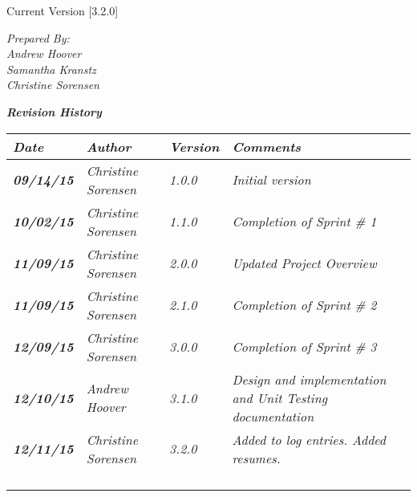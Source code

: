 


Current Version [3.2.0]
\vspace*{5mm}

{\color{MSBlue3}
\noindent
\textit{Prepared By:}\\
\textit{Andrew Hoover}\\
\textit{Samantha Kranstz}\\
\textit{Christine Sorensen}
}

\vfill
\noindent
{\color{color02} \textit{\textbf{Revision History}}}\\
\begin{tabular}{|>{\raggedright}p{1.5cm}|>{\raggedright}p{3cm}|>{\raggedright}p{1.5cm}|>{\raggedright}p{9cm}|}
\hline
\textit{\textbf{Date}} &  \textit{\textbf{Author}} & \textit{\textbf{Version}} & \textit{\textbf{Comments}}\tabularnewline
\hline
\textit{\textbf{09/14/15}} & \textit{Christine Sorensen} & \textit{1.0.0} & \textit{Initial version}\tabularnewline
\hline
\textit{\textbf{10/02/15}} & \textit{Christine Sorensen} & \textit{1.1.0} & \textit{Completion of Sprint \# 1}\tabularnewline
\hline
\textit{\textbf{11/09/15}} & \textit{Christine Sorensen} & \textit{2.0.0} & \textit{Updated Project Overview}\tabularnewline
\hline
\textit{\textbf{11/09/15}} & \textit{Christine Sorensen} & \textit{2.1.0} & \textit{Completion of Sprint \# 2}\tabularnewline
\hline
\textit{\textbf{12/09/15}} & \textit{Christine Sorensen} & \textit{3.0.0} & \textit{Completion of Sprint \# 3}\tabularnewline
\hline
\textit{\textbf{12/10/15}} & \textit{Andrew Hoover} & \textit{3.1.0} & \textit{Design and implementation and Unit Testing documentation}\tabularnewline
\hline
\textit{\textbf{12/11/15}} & \textit{Christine Sorensen} & \textit{3.2.0} & \textit{Added to log entries. Added resumes.}\tabularnewline
 \hline
 &  &  & \tabularnewline
\hline
 &  &  & \tabularnewline
\hline
 &  &  & \tabularnewline
\hline
 &  &  & \tabularnewline
\hline
\end{tabular}
\vfill

